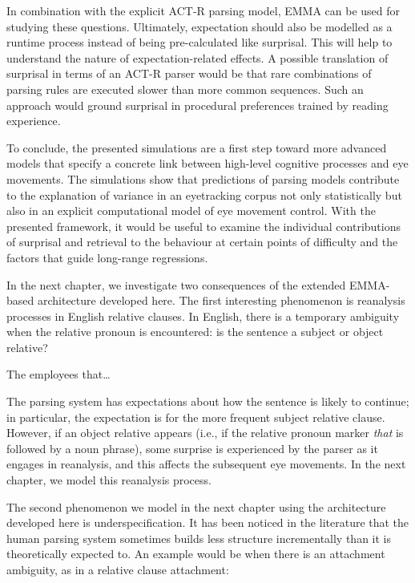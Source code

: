 In combination with the explicit ACT-R parsing model, EMMA can be used for studying these questions. 
Ultimately, expectation should also be modelled as a runtime process instead of being pre-calculated like surprisal. This will help to understand the nature of expectation-related effects. A possible translation of surprisal in terms of an ACT-R parser would be that rare combinations of parsing rules are executed slower than more common sequences. Such an approach would ground surprisal in procedural preferences trained by reading experience.

To conclude, the presented simulations are a first step toward more advanced models that specify a concrete link between high-level cognitive processes and eye movements.  The simulations show that predictions of parsing models contribute to the explanation of variance in an eyetracking corpus not only statistically but also in an explicit computational model of eye movement control.  
With the presented framework, it would be useful to examine the individual contributions of surprisal and retrieval to the behaviour at certain points of difficulty and the factors that guide long-range regressions.

In the next chapter, we investigate two consequences of the extended EMMA-based architecture developed here. The first interesting phenomenon is reanalysis processes in English relative clauses. In English, there is a temporary ambiguity when the relative pronoun is encountered: is the sentence a subject or object relative? 

\begin{exe}
\ex
The employees that\dots
\end{exe}

The parsing system has expectations about how the sentence is likely to continue; in particular, the expectation is for the more frequent subject relative clause. However, if an object relative appears (i.e., if the relative pronoun marker \textit{that} is followed by a noun phrase), some surprise is experienced by the parser as it engages in reanalysis, and this affects the subsequent eye movements. In the next chapter, we model this reanalysis process.

The second phenomenon we model in the next chapter using the architecture developed here is underspecification. It has been noticed in the literature that the human parsing system sometimes builds less structure incrementally than it is theoretically expected to. An example would be when there is an attachment ambiguity, as in a relative clause attachment:

